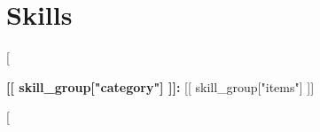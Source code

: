\section{Skills}

[%
    \begin{onecolentry}
        \textbf{[[ skill_group["category"] ]]:} [[ skill_group["items"] ]]
    \end{onecolentry}

    \vspace{0.05 cm}

[%
